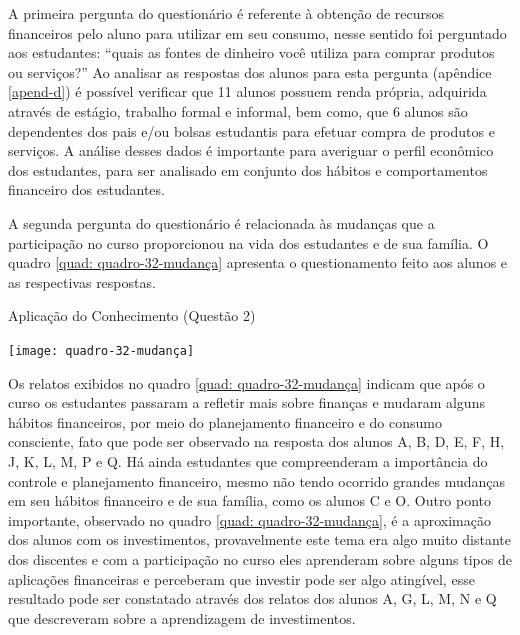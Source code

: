 A primeira pergunta do questionário é referente à obtenção de recursos financeiros pelo aluno para utilizar em seu consumo, nesse sentido foi perguntado aos estudantes: “quais as fontes de dinheiro você utiliza para comprar produtos ou serviços?” Ao analisar as respostas dos alunos para esta pergunta (apêndice \ref{apend-d}) é possível verificar que 11 alunos possuem renda própria, adquirida através de estágio, trabalho formal e informal, bem como, que 6 alunos são dependentes dos pais e/ou bolsas estudantis para efetuar compra de produtos e serviços. A análise desses dados é importante para averiguar o perfil econômico dos estudantes, para ser analisado em conjunto dos hábitos e comportamentos financeiro dos estudantes.

A segunda pergunta do questionário é relacionada às mudanças que a participação no curso proporcionou na vida dos estudantes e de sua família. O quadro \ref{quad: quadro-32-mudança} apresenta o questionamento feito aos alunos e as respectivas respostas.

\graphicspath{{quadros/}}
\begin{quadro}[!ht]
\centering
\begin{minipage}{0.80\textwidth}
\caption{Aplicação do Conhecimento (Questão 2)}
\centering
\texttt{[image: quadro-32-mudança]}
\label{quad: quadro-32-mudança}
\end{minipage}
\end{quadro}

\newpage
Os relatos exibidos no quadro \ref{quad: quadro-32-mudança} indicam que após o curso os estudantes passaram a refletir mais sobre finanças e mudaram alguns hábitos financeiros, por meio do planejamento financeiro e do consumo consciente, fato que pode ser observado na resposta dos alunos A, B, D, E, F, H, J, K, L, M, P e Q. Há ainda estudantes que compreenderam a importância do controle e planejamento financeiro, mesmo não tendo ocorrido grandes mudanças em seu hábitos financeiro e de sua família, como os alunos C e O. Outro ponto importante, observado no quadro \ref{quad: quadro-32-mudança}, é a aproximação dos alunos com os investimentos, provavelmente este tema era algo muito distante dos discentes e com a participação no curso eles aprenderam sobre alguns tipos de aplicações financeiras e perceberam que investir pode ser algo atingível, esse resultado pode ser constatado através dos relatos dos alunos A, G, L, M, N e Q que descreveram sobre a aprendizagem de investimentos.

